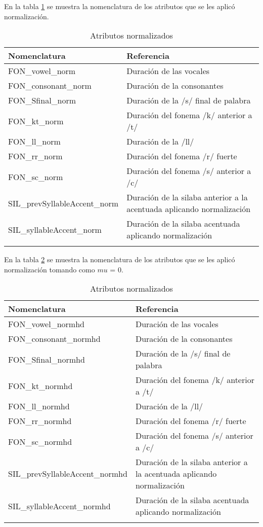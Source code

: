 \begin{flushleft}
En la tabla \ref{tab:attrNorm} se muestra la nomenclatura de los atributos que se les aplicó normalización.	
\end{flushleft}

\centering
\begin{longtable}{| p{} | p{} |} 
\hline
\textbf{Nomenclatura}  & \textbf{Referencia}   \\ \hline
FON\_vowel\_norm & Duración de las vocales \\ \hline
FON\_consonant\_norm & Duración de la consonantes \\ \hline
FON\_Sfinal\_norm & Duración de la /s/ final de palabra \\ \hline
FON\_kt\_norm & Duración del fonema /k/ anterior a /t/ \\ \hline
FON\_ll\_norm & Duración de la /ll/ \\ \hline
FON\_rr\_norm & Duración del fonema /r/ fuerte \\ \hline
FON\_sc\_norm & Duración del fonema /s/ anterior a /c/ \\ \hline
SIL\_prevSyllableAccent\_norm & Duración de la silaba anterior a la acentuada aplicando normalización\\ \hline
SIL\_syllableAccent\_norm & Duración de la silaba acentuada aplicando normalización \\ \hline
\caption{Atributos normalizados} 
\label{tab:attrNorm}
\end{longtable}

\begin{flushleft}
En la tabla \ref{tab:attrNormhd} se muestra la nomenclatura de los atributos que se les aplicó normalización tomando como $mu$ = 0.	
\end{flushleft}

\centering
\begin{longtable}{| p{} | p{} |} 
\hline
\textbf{Nomenclatura}  & \textbf{Referencia}   \\ \hline
FON\_vowel\_normhd & Duración de las vocales \\ \hline
FON\_consonant\_normhd & Duración de la consonantes \\ \hline
FON\_Sfinal\_normhd & Duración de la /s/ final de palabra \\ \hline
FON\_kt\_normhd & Duración del fonema /k/ anterior a /t/ \\ \hline
FON\_ll\_normhd & Duración de la /ll/ \\ \hline
FON\_rr\_normhd & Duración del fonema /r/ fuerte \\ \hline
FON\_sc\_normhd & Duración del fonema /s/ anterior a /c/ \\ \hline
SIL\_prevSyllableAccent\_normhd & Duración de la silaba anterior a la acentuada aplicando normalización\\ \hline
SIL\_syllableAccent\_normhd & Duración de la silaba acentuada aplicando normalización \\ \hline
\caption{Atributos normalizados} 
\label{tab:attrNormhd}
\end{longtable}